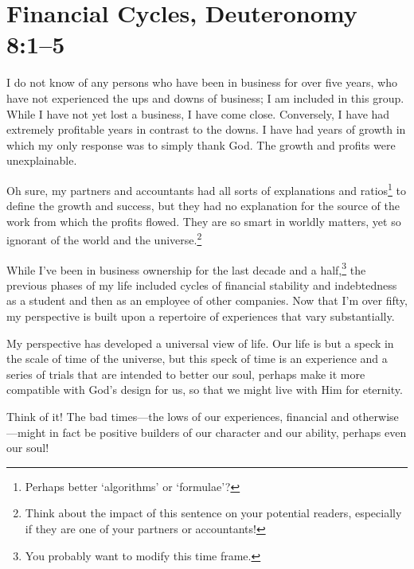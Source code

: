 \documentclass[12pt]{memoir}
\begin{document}
\section[Financial Cycles]{Financial Cycles, Deuteronomy 8:1--5}

I do not know of any persons who have been in business for over five
years, who have not experienced the ups and downs of business; I am included in this group. While I have not yet lost a business,
I have come close. Conversely, I have had extremely profitable years
in contrast to the downs. I have had years of growth in which my only response was to simply thank God. The growth and profits were unexplainable.

Oh sure, my partners and accountants had all sorts of explanations and ratios\footnote{Perhaps better `algorithms' or `formulae'?} to define the growth and success,
but they had no explanation for the source of the work from which
the profits flowed. They are so smart in worldly matters, yet so ignorant
of the world and the universe.\footnote{Think about the impact of this sentence on your potential readers, especially if they are one of your partners or accountants!}

While I've been in business ownership for the last decade and a half,\footnote{You probably want to modify this time frame.} the previous phases of my life included cycles of financial stability
and indebtedness as a student and then as an employee of other companies.
Now that I'm over fifty, my perspective is built upon a repertoire
of experiences that vary substantially.

My perspective has developed a universal view of life. Our life is but a speck in the scale of time of the universe, but this speck of time is an experience and a series of trials that are intended to better our soul, perhaps make it more compatible with God's design for us, so that we might live with Him for eternity. 

Think of it! The bad times---the lows of our  experiences, financial and otherwise---might in fact be positive builders of our character and our ability, perhaps
even our soul!
\end{document}
